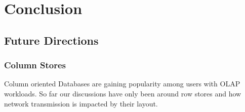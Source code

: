 
\chapter{Conclusion}
\label{chap:conclusion}
\section{Future Directions}
\subsection{Column Stores}
Column oriented Databases are gaining popularity among users with OLAP workloads. 
So far our discussions have only been around row stores and how network transmission 
is impacted by their layout. 